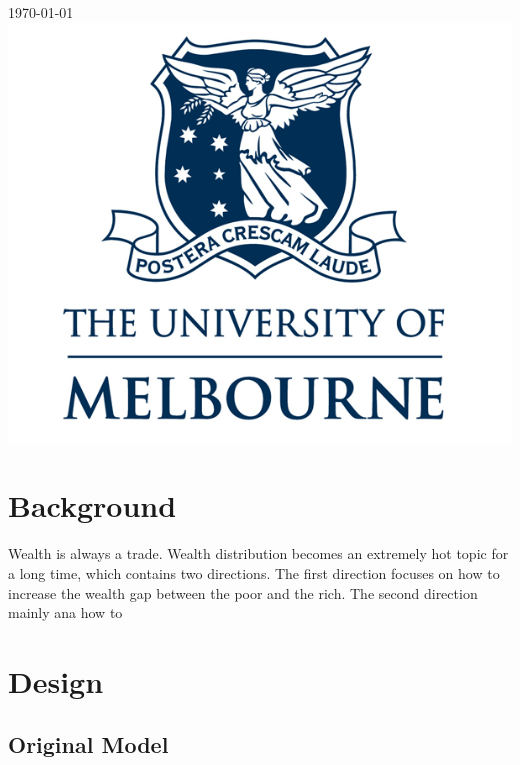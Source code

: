 \begin{titlepage}
{\large \today}\\[2cm] %


\includegraphics[scale = 0.27]{logo.png}\\[1cm] %
 

\vfill %

\end{titlepage}


\section{Background}
Wealth is always a  trade. Wealth distribution becomes an extremely hot topic for a long time, which contains two directions. The first direction focuses on how to increase the wealth gap between the poor and the rich. The second direction mainly ana how to 
\section{Design}
\subsection{Original Model}
